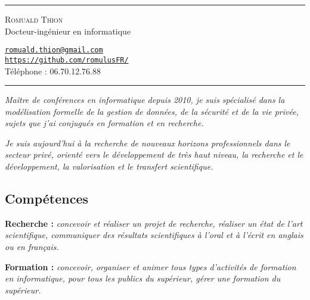 \documentclass[12pt,a4paper]{article}
\newcommand{\hr}{\textcolor{gris80}{\rule{\linewidth}{0.5pt}}}
\newcommand{\activite}[1]{\textbf{#1}\xspace}
\newcommand{\comment}[1]{\textsl{#1}\xspace}
\begin{document}
\hr

\vspace{0.5em}

\begin{minipage}[c]{0.5\textwidth}
  \begin{center}
    {\LARGE\textsc{Romuald Thion}}\\
    Docteur-ingénieur en informatique\\
  \end{center}
\end{minipage}
\begin{minipage}[c]{0.5\textwidth}
  \begin{center}
    \href{mailto:romuald.thion@gmail.com}{\nolinkurl{romuald.thion@gmail.com}}\\
    \href{https://github.com/romulusFR/}{\nolinkurl{https://github.com/romulusFR/}}\\
    Téléphone : 06.70.12.76.88\\
  \end{center}
\end{minipage}

\vspace{0.5em}

\hr

\begin{center}
  \emph{Maître de conférences en informatique depuis 2010, je suis spécialisé dans la modélisation formelle de la gestion de données, de la sécurité et de la vie privée, sujets que j'ai conjugués en formation et en recherche.}

  \emph{Je suis aujourd'hui à la recherche de nouveaux horizons professionnels dans le secteur privé, orienté vers le développement de très haut niveau, la recherche et le développement, la valorisation et le transfert scientifique.}
\end{center}

\subsection*{Compétences}

  \activite{Recherche :}
  \comment{concevoir et réaliser un projet de recherche, réaliser un état de l'art scientifique, communiquer des résultats scientifiques à l'oral et à l'écrit en anglais ou en français.}

  \activite{Formation :}
  \comment{concevoir, organiser et animer tous types d'activités de formation en informatique, pour tous les publics du supérieur, gérer une formation du supérieur.}
\end{document}
